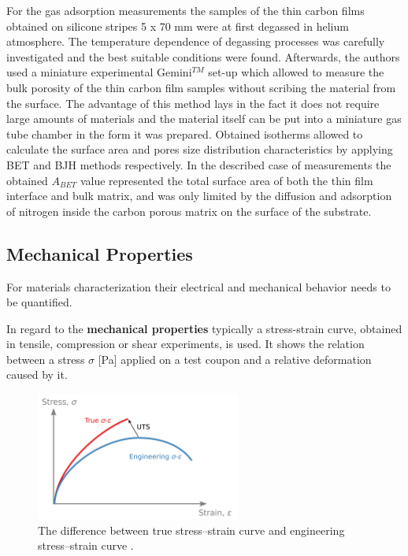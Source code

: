 For the gas adsorption measurements the samples of the thin carbon films obtained on silicone stripes 5 x 70 mm were at first degassed in helium atmosphere. The temperature dependence of degassing processes was carefully investigated and the best suitable conditions were found. Afterwards, the authors used a miniature experimental Gemini$^{TM}$ set-up which allowed to measure the bulk porosity of the thin carbon film samples without scribing the material from the surface. The advantage of this method lays in the fact it does not require large amounts of materials and the material itself can be put into a miniature gas tube chamber in the form it was prepared.  Obtained isotherms allowed to calculate the surface area and pores size distribution characteristics by applying BET and BJH methods respectively. In the described case of measurements the obtained $A_{BET}$ value represented the total surface area of both the thin film interface and bulk matrix, and was only limited by the diffusion and adsorption of nitrogen inside the carbon porous matrix on the surface of the substrate. 

\subsection{Mechanical Properties}

For materials characterization their electrical and mechanical behavior needs to be quantified. 

In regard to the \textbf{mechanical properties} typically a stress-strain curve, obtained in tensile, compression or shear experiments, is used. It shows the relation between a stress $\sigma$ [Pa] applied on a test coupon and a relative deformation caused by it. 


\begin{figure}[H]
\centering
\includegraphics[width=0.6\textwidth]{Figures/Theory/2880px-Stress_strain_comparison.png}
\medskip
\captionsetup{width=0.6\linewidth}
\caption{The difference between true stress–strain curve and engineering stress–strain curve \cite{strain-stress-curve}.}
\label{fig:stress-curve}
\end{figure}

